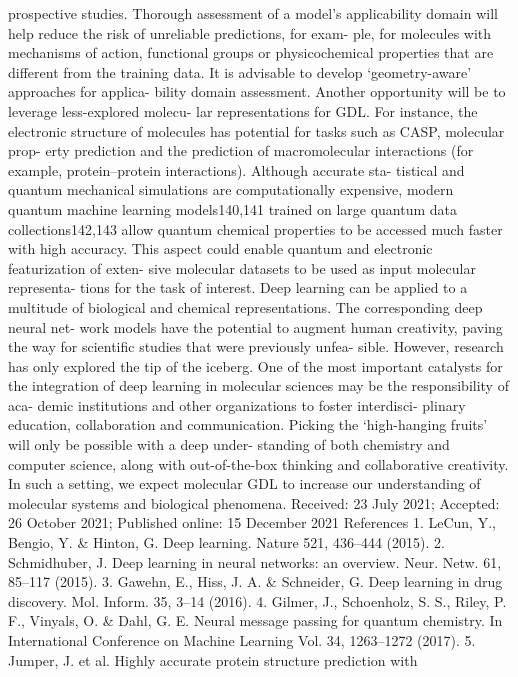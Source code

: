 prospective studies. Thorough assessment of a model’s applicability
domain will help reduce the risk of unreliable predictions, for exam-
ple, for molecules with mechanisms of action, functional groups or
physicochemical properties that are different from the training data.
It is advisable to develop ‘geometry-aware’ approaches for applica-
bility domain assessment.
Another opportunity will be to leverage less-explored molecu-
lar representations for GDL. For instance, the electronic structure
of molecules has potential for tasks such as CASP, molecular prop-
erty prediction and the prediction of macromolecular interactions
(for example, protein–protein interactions). Although accurate sta-
tistical and quantum mechanical simulations are computationally
expensive, modern quantum machine learning models140,141 trained
on large quantum data collections142,143 allow quantum chemical
properties to be accessed much faster with high accuracy. This
aspect could enable quantum and electronic featurization of exten-
sive molecular datasets to be used as input molecular representa-
tions for the task of interest.
Deep learning can be applied to a multitude of biological and
chemical representations. The corresponding deep neural net-
work models have the potential to augment human creativity,
paving the way for scientific studies that were previously unfea-
sible. However, research has only explored the tip of the iceberg.
One of the most important catalysts for the integration of deep
learning in molecular sciences may be the responsibility of aca-
demic institutions and other organizations to foster interdisci-
plinary education, collaboration and communication. Picking
the ‘high-hanging fruits’ will only be possible with a deep under-
standing of both chemistry and computer science, along with
out-of-the-box thinking and collaborative creativity. In such a
setting, we expect molecular GDL to increase our understanding
of molecular systems and biological phenomena.
Received: 23 July 2021; Accepted: 26 October 2021;
Published online: 15 December 2021
References
	1.
LeCun, Y., Bengio, Y. \& Hinton, G. Deep learning. Nature 521,
436–444 (2015).
	2.
Schmidhuber, J. Deep learning in neural networks: an overview. Neur. Netw.
61, 85–117 (2015).
	3.
Gawehn, E., Hiss, J. A. \& Schneider, G. Deep learning in drug discovery.
Mol. Inform. 35, 3–14 (2016).
	4.
Gilmer, J., Schoenholz, S. S., Riley, P. F., Vinyals, O. \& Dahl, G. E. Neural
message passing for quantum chemistry. In International Conference on
Machine Learning Vol. 34, 1263–1272 (2017).
	5.
Jumper, J. et al. Highly accurate protein structure prediction with
